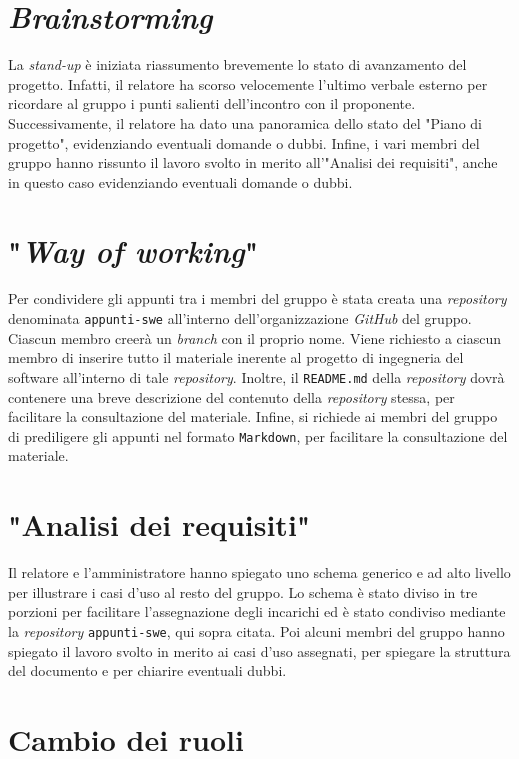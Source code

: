 \section{\textit{Brainstorming}}

La \textit{stand-up} è iniziata riassumento brevemente lo stato di avanzamento
del progetto. Infatti, il relatore ha scorso velocemente l'ultimo verbale
esterno per ricordare al gruppo i punti salienti dell'incontro con il
proponente. Successivamente, il relatore ha dato una panoramica dello stato del
"Piano di progetto", evidenziando eventuali domande o dubbi. Infine, i vari
membri del gruppo hanno rissunto il lavoro svolto in merito all'"Analisi dei
requisiti", anche in questo caso evidenziando eventuali domande o dubbi.

\section{"\textit{Way of working}"}

Per condividere gli appunti tra i membri del gruppo è stata creata una
\textit{repository} denominata \texttt{appunti-swe} all'interno
dell'organizzazione \textit{GitHub} del gruppo. Ciascun membro creerà un
\textit{branch} con il proprio nome. Viene richiesto a ciascun membro di
inserire tutto il materiale inerente al progetto di ingegneria del software
all'interno di tale \textit{repository}. Inoltre, il \texttt{README.md} della
\textit{repository} dovrà contenere una breve descrizione del contenuto della
\textit{repository} stessa, per facilitare la consultazione del materiale.
Infine, si richiede ai membri del gruppo di prediligere gli appunti nel formato
\texttt{Markdown}, per facilitare la consultazione del materiale.

\section{"Analisi dei requisiti"}

Il relatore e l'amministratore hanno spiegato uno schema
generico e ad alto livello per illustrare i casi d'uso al resto del gruppo. Lo
schema è stato diviso in tre porzioni per facilitare l'assegnazione degli
incarichi ed è stato condiviso mediante la \textit{repository}
\texttt{appunti-swe}, qui sopra citata. Poi alcuni membri del gruppo hanno
spiegato il lavoro svolto in merito ai casi d'uso assegnati, per spiegare la
struttura del documento e per chiarire eventuali dubbi.

\section{Cambio dei ruoli}

